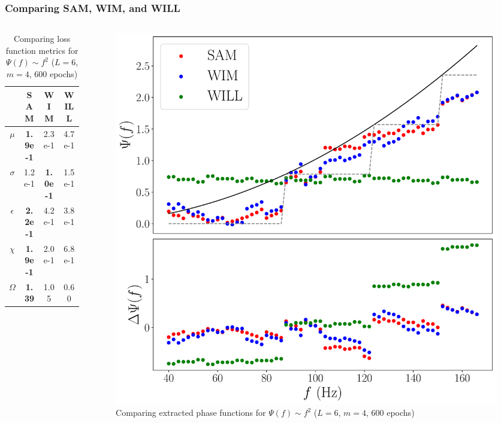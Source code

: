 \documentclass{beamer}
\begin{document}
\begin{frame}
\frametitle{Comparing SAM, WIM, and WILL}
\begin{columns}
\begin{column}{0.5\textwidth}
\begin{table}
\begin{tabular}{c || c| c| c }
& SAM & WIM & WILL \\ \hline \hline 
$\mu$ &  \textbf{1.9e-1} & 2.3e-1 & 4.7e-1 \\
$\sigma$ &  1.2e-1 & \textbf{1.0e-1} & 1.5e-1\\
$\epsilon$  &  \textbf{2.2e-1} & 4.2e-1 & 3.8e-1\\
$\chi$ &  \textbf{1.9e-1} & 2.0e-1 & 6.8e-1 \\ \hline 
$\Omega$ &  \textbf{1.39} & 1.05 & 0.60
\end{tabular}
\caption{Comparing loss function metrics for $\Psi(f) \sim f^2$ ($L=6$, $m=4$, 600 epochs)}
\end{table}
\end{column}
\begin{column}{0.5\textwidth}
\begin{figure}
\centering 
\includegraphics[width=\textwidth]{im/SAM_WIM_WILL_F2}
\caption{Comparing extracted phase functions for $\Psi(f) \sim f^2$ ($L=6$, $m=4$, 600 epochs)}
\end{figure}
\end{column}
\end{columns}
\end{frame}
\end{document}
